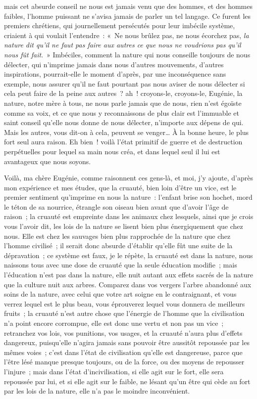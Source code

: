 \documentclass[french,twoside]{book} %
\begin{document}
mais cet absurde conseil ne nous est jamais venu que des hommes, et des hommes faibles, l’homme puissant ne s’avisa jamais de parler un tel langage. Ce furent les premiers chrétiens, qui journellement persécutés pour leur imbécile système, criaient à qui voulait l’entendre : « Ne nous brûlez pas, ne nous écorchez pas, {\itshape la nature dit qu’il ne faut pas faire aux autres ce que nous ne voudrions pas qu’il nous fût fait}. » Imbéciles, comment la nature qui nous conseille toujours de nous délecter, qui n’imprime jamais dans nous d’autres mouvements, d’autres inspirations, pourrait-elle le moment d’après, par une inconséquence sans exemple, nous assurer qu’il ne faut pourtant pas nous aviser de nous délecter si cela peut faire de la peine aux autres ? ah ! croyons-le, croyons-le, Eugénie, la nature, notre mère à tous, ne nous parle jamais que de nous, rien n’est égoïste comme sa voix, et ce que nous y reconnaissons de plus clair est l’immuable et saint conseil qu’elle nous donne de nous délecter, n’importe aux dépens de qui. Mais les autres, vous dit-on à cela, peuvent se venger… À la bonne heure, le plus fort seul aura raison. Eh bien ! voilà l’état primitif de guerre et de destruction perpétuelles pour lequel sa main nous créa, et dans lequel seul il lui est avantageux que nous soyons.\par
Voilà, ma chère Eugénie, comme raisonnent ces gens-là, et moi, j’y ajoute, d’après mon expérience et mes études, que la cruauté, bien loin d’être un vice, est le premier sentiment qu’imprime en nous la nature : l’enfant brise son hochet, mord le téton de sa nourrice, étrangle son oiseau bien avant que d’avoir l’âge de raison ; la cruauté est empreinte dans les animaux chez lesquels, ainsi que je crois vous l’avoir dit, les lois de la nature se lisent bien plus énergiquement que chez nous. Elle est chez les sauvages bien plus rapprochée de la nature que chez l’homme civilisé ; il serait donc absurde d’établir qu’elle fût une suite de la dépravation ; ce système est faux, je le répète, la cruauté est dans la nature, nous naissons tous avec une dose de cruauté que la seule éducation modifie ; mais l’éducation n’est pas dans la nature, elle nuit autant aux effets sacrés de la nature que la culture nuit aux arbres. Comparez dans vos vergers l’arbre abandonné aux soins de la nature, avec celui que votre art soigne en le contraignant, et vous verrez lequel est le plus beau, vous éprouverez lequel vous donnera de meilleurs fruits ; la cruauté n’est autre chose que l’énergie de l’homme que la civilisation n’a point encore corrompue, elle est donc une vertu et non pas un vice ; retranchez vos lois, vos punitions, vos usages, et la cruauté n’aura plus d’effets dangereux, puisqu’elle n’agira jamais sans pouvoir être aussitôt repoussée par les mêmes voies ; c’est dans l’état de civilisation qu’elle est dangereuse, parce que l’être lésé manque presque toujours, ou de la force, ou des moyens de repousser l’injure ; mais dans l’état d’incivilisation, si elle agit sur le fort, elle sera repoussée par lui, et si elle agit sur le faible, ne lésant qu’un être qui cède au fort par les lois de la nature, elle n’a pas le moindre inconvénient.\par
\end{document}
